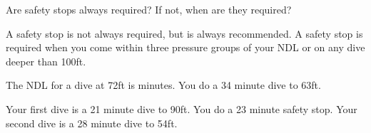 \documentclass[12pt,letter]{exam}
\begin{document}
\begin{questions}

        \question Are safety stops always required? If not, when are they required?
        \begin{solution}[1.5in]
            A safety stop is not always required, but is always recommended. A safety stop is required when you come within three pressure groups of your NDL or on any dive deeper than 100ft.
        \end{solution}

        \question The NDL for a dive at 72ft is \fillin[30] minutes.
        \question You do a 34 minute dive to 63ft.

        \question Your first dive is a 21 minute dive to 90ft. You do a 23 minute safety stop. Your second dive is a 28 minute dive to 54ft.
\end{questions}
\end{document}
